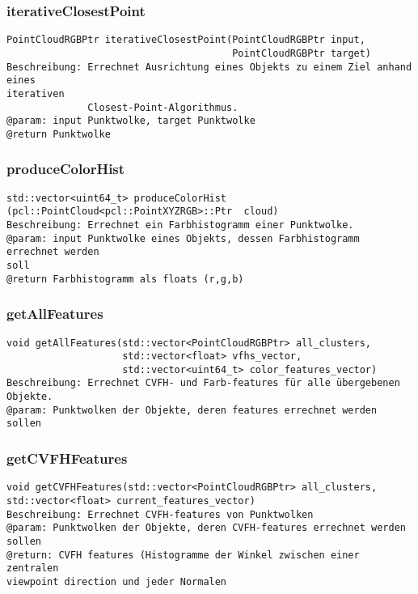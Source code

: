 \documentclass{suturo}
\begin{document}
\subsubsection{iterativeClosestPoint}
\begin{verbatim}
PointCloudRGBPtr iterativeClosestPoint(PointCloudRGBPtr input,
                                       PointCloudRGBPtr target)
Beschreibung: Errechnet Ausrichtung eines Objekts zu einem Ziel anhand eines
iterativen 
			  Closest-Point-Algorithmus.
@param: input Punktwolke, target Punktwolke
@return Punktwolke
\end{verbatim}\label{func:iterativeClosestPoint}

\subsubsection{produceColorHist}
\begin{verbatim}
std::vector<uint64_t> produceColorHist
(pcl::PointCloud<pcl::PointXYZRGB>::Ptr  cloud)
Beschreibung: Errechnet ein Farbhistogramm einer Punktwolke.
@param: input Punktwolke eines Objekts, dessen Farbhistogramm errechnet werden
soll
@return Farbhistogramm als floats (r,g,b)
\end{verbatim}\label{func:produceColorHist}

\subsubsection{getAllFeatures}
\begin{verbatim}
void getAllFeatures(std::vector<PointCloudRGBPtr> all_clusters,
                    std::vector<float> vfhs_vector,
                    std::vector<uint64_t> color_features_vector)
Beschreibung: Errechnet CVFH- und Farb-features für alle übergebenen Objekte.
@param: Punktwolken der Objekte, deren features errechnet werden sollen
\end{verbatim}\label{func:getallfeatures}

\subsubsection{getCVFHFeatures}
\begin{verbatim}
void getCVFHFeatures(std::vector<PointCloudRGBPtr> all_clusters,
std::vector<float> current_features_vector)
Beschreibung: Errechnet CVFH-features von Punktwolken
@param: Punktwolken der Objekte, deren CVFH-features errechnet werden sollen
@return: CVFH features (Histogramme der Winkel zwischen einer zentralen
viewpoint direction und jeder Normalen
\end{verbatim}\label{func:getcvfhfeatures}
\end{document}
